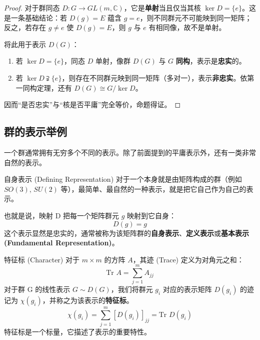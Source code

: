 \begin{proof}
    对于群同态 $D: G \to GL(m, \mathbb{C})$，它是\textbf{单射}当且仅当其核 $\ker D = \{e\}$。这是一条基础结论：若 $D(g)=E$ 蕴含 $g=e$，则不同群元不可能映到同一矩阵；反之，若存在 $g\ne e$ 使 $D(g)=E$，则 $g$ 与 $e$ 有相同像，故不是单射。

    将此用于表示 $D(G)$：
    \begin{enumerate}
        \item 若 $\ker D=\{e\}$，同态 $D$ 单射，像群 $D(G)$ 与 $G$ \textbf{同构}，表示是\textbf{忠实}的。
        \item 若 $\ker D\supsetneqq\{e\}$，则存在不同群元映到同一矩阵（多对一），表示\textbf{非忠实}。依第一同构定理，还有 $D(G)\cong G/\ker D$。
    \end{enumerate}
    因而“是否忠实”与“核是否平庸”完全等价，命题得证。
\end{proof}


\subsection{群的表示举例}
一个群通常拥有无穷多个不同的表示。除了前面提到的平庸表示外，还有一类非常自然的表示。

\begin{example}{自身表示 (Defining Representation)}
    对于一个本身就是由矩阵构成的群（例如 $SO(3)$, $SU(2)$ 等），最简单、最自然的一种表示，就是把它自己作为自己的表示。
    
    也就是说，映射 D 把每一个矩阵群元 $g$ 映射到它自身：
    $$
        D(g) = g
    $$
    这个表示显然是忠实的，通常被称为该矩阵群的\textbf{自身表示}、\textbf{定义表示}或\textbf{基本表示 (Fundamental Representation)}。
\end{example}



\begin{definition}{特征标 (Character)}
    对于 $m \times m$ 的方阵 $A$，其迹 (Trace) 定义为对角元之和：
    \begin{equation}
        \text{Tr } A = \sum_{j=1}^m A_{jj}
    \end{equation}
    对于群 G 的线性表示 $G \sim D(G)$，我们将群元 $g_i$ 对应的表示矩阵 $D(g_i)$ 的迹记为 $\chi(g_i)$，并称之为该表示的\textbf{特征标}。
    \begin{equation}
        \chi(g_i) = \sum_{j=1}^m [D(g_i)]_{jj} = \text{Tr } D(g_i)
    \end{equation}
    特征标是一个标量，它描述了表示的重要特性。
\end{definition}

